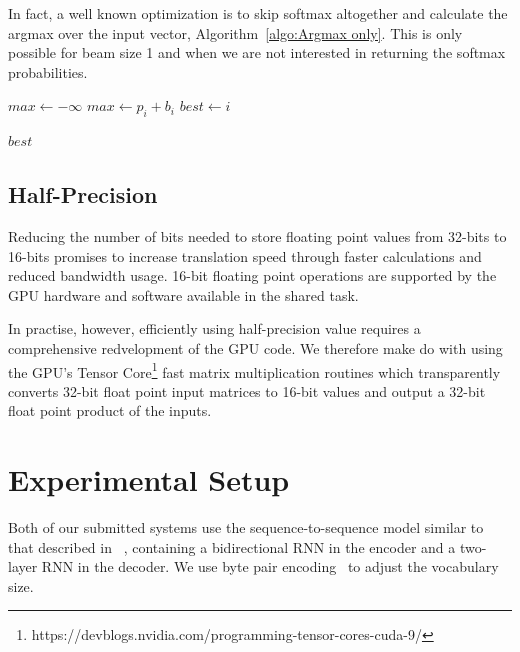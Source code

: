 \documentclass[11pt,a4paper]{article}
\begin{document}
In fact, a well known optimization is to skip softmax altogether and calculate the argmax over the input vector, Algorithm~\ref{algo:Argmax only}. This is only possible for beam size 1 and when we are not interested in returning the softmax probabilities.

\begin{algorithm}
\begin{algorithmic}

\State $max \gets - \infty$ 
    \State $max \gets p_i + b_i$
    \State $best \gets i$
  \EndIf
\EndFor

\Return $best$ 

\EndProcedure

\end{algorithmic}
\caption{Find 1-best only}
\label{algo:Argmax only}
\end{algorithm}


\subsection{Half-Precision}

Reducing the number of bits needed to store floating point values from 32-bits to 16-bits promises to increase translation speed through faster calculations and reduced bandwidth usage. 16-bit floating point operations are supported by the GPU hardware and software available in the shared task.

In practise, however, efficiently using half-precision value requires a comprehensive redvelopment of the GPU code. We therefore make do with using the GPU's Tensor Core\footnote{https://devblogs.nvidia.com/programming-tensor-cores-cuda-9/} fast matrix multiplication routines which transparently converts 32-bit float point input matrices to 16-bit values and output a 32-bit float point product of the inputs.

\section{Experimental Setup}
\label{sec:Experimental Setup}

Both of our submitted systems use the sequence-to-sequence model similar to that described in ~\citet{DBLP:journals/corr/BahdanauCB14}, containing a bidirectional RNN in the encoder and a two-layer RNN in the decoder. We use byte pair encoding~\citep{sennrich-haddow-birch:2016:P16-12} to adjust the vocabulary size.
\end{document}

